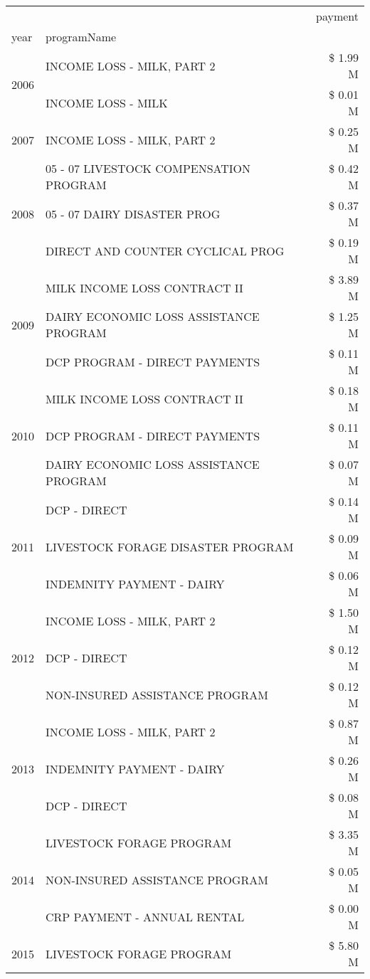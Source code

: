 \begin{tabular}{llr}
\toprule
 &  & payment \\
year & programName &  \\
\midrule
\multirow[t]{2}{*}{2006} & INCOME LOSS - MILK, PART 2 & \$ 1.99 M \\
 & INCOME LOSS - MILK & \$ 0.01 M \\
\cline{1-3}
2007 & INCOME LOSS - MILK, PART 2 & \$ 0.25 M \\
\cline{1-3}
\multirow[t]{3}{*}{2008} & 05 - 07 LIVESTOCK COMPENSATION PROGRAM & \$ 0.42 M \\
 & 05 - 07 DAIRY DISASTER PROG & \$ 0.37 M \\
 & DIRECT AND COUNTER CYCLICAL PROG & \$ 0.19 M \\
\cline{1-3}
\multirow[t]{3}{*}{2009} & MILK INCOME LOSS CONTRACT II & \$ 3.89 M \\
 & DAIRY ECONOMIC LOSS ASSISTANCE PROGRAM & \$ 1.25 M \\
 & DCP PROGRAM - DIRECT PAYMENTS & \$ 0.11 M \\
\cline{1-3}
\multirow[t]{3}{*}{2010} & MILK INCOME LOSS CONTRACT II & \$ 0.18 M \\
 & DCP PROGRAM - DIRECT PAYMENTS & \$ 0.11 M \\
 & DAIRY ECONOMIC LOSS ASSISTANCE PROGRAM & \$ 0.07 M \\
\cline{1-3}
\multirow[t]{3}{*}{2011} & DCP - DIRECT & \$ 0.14 M \\
 & LIVESTOCK FORAGE DISASTER PROGRAM & \$ 0.09 M \\
 & INDEMNITY PAYMENT - DAIRY & \$ 0.06 M \\
\cline{1-3}
\multirow[t]{3}{*}{2012} & INCOME LOSS - MILK, PART 2 & \$ 1.50 M \\
 & DCP - DIRECT & \$ 0.12 M \\
 & NON-INSURED ASSISTANCE PROGRAM & \$ 0.12 M \\
\cline{1-3}
\multirow[t]{3}{*}{2013} & INCOME LOSS - MILK, PART 2 & \$ 0.87 M \\
 & INDEMNITY PAYMENT - DAIRY & \$ 0.26 M \\
 & DCP - DIRECT & \$ 0.08 M \\
\cline{1-3}
\multirow[t]{3}{*}{2014} & LIVESTOCK FORAGE PROGRAM & \$ 3.35 M \\
 & NON-INSURED ASSISTANCE PROGRAM & \$ 0.05 M \\
 & CRP PAYMENT - ANNUAL RENTAL & \$ 0.00 M \\
\cline{1-3}
\multirow[t]{3}{*}{2015} & LIVESTOCK FORAGE PROGRAM & \$ 5.80 M \\

\end{tabular}
